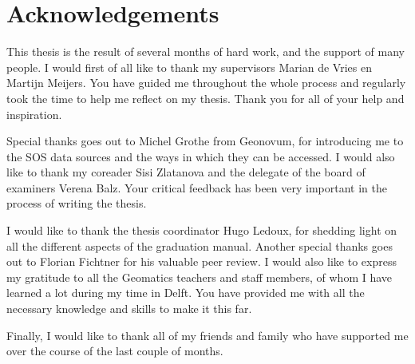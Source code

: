 
\chapter*{Acknowledgements}

This thesis is the result of several months of hard work, and the support of many people. I would first of all like to thank my supervisors Marian de Vries en Martijn Meijers. You have guided me throughout the whole process and regularly took the time to help me reflect on my thesis. Thank you for all of your help and inspiration.   

Special thanks goes out to Michel Grothe from Geonovum, for introducing me to the SOS data sources and the ways in which they can be accessed. I would also like to thank my coreader Sisi Zlatanova and the delegate of the board of examiners Verena Balz. Your critical feedback has been very important in the process of writing the thesis. 

I would like to thank the thesis coordinator Hugo Ledoux, for shedding light on all the different aspects of the graduation manual. Another special thanks goes out to Florian Fichtner for his valuable peer review. I would also like to express my gratitude to all the Geomatics teachers and staff members, of whom I have learned a lot during my time in Delft. You have provided me with all the necessary knowledge and skills to make it this far. 

Finally, I would like to thank all of my friends and family who have supported me over the course of the last couple of months.   